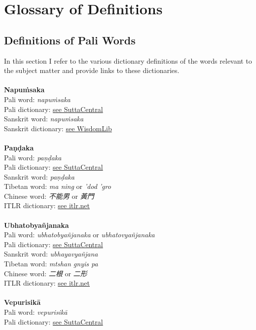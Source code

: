\section{Glossary of Definitions}
\label{appendix3}

\subsection{Definitions of Pali Words}
In this section I refer to the various dictionary definitions of the words relevant to the subject matter and provide links to these dictionaries.\\
\\
\medskip
\large \textbf{Napuṁsaka}
\\
Pali word: {\em napuṁsaka} \\
Pali dictionary: \href{https://suttacentral.net/define/napu%E1%B9%83saka}{see SuttaCentral} \\
Sanskrit word: {\em napuṁsaka} \\
Sanskrit dictionary: \href{https://www.wisdomlib.org/definition/napumsaka}{see WisdomLib} \\
\\
\medskip
\large \textbf{Paṇḍaka}
\\
Pali word: {\em paṇḍaka} \\
Pali dictionary: \href{https://suttacentral.net/define/pa%E1%B9%87%E1%B8%8Daka}{see SuttaCentral} \\
Sanskrit word: {\em paṇḍaka} \\
Tibetan word: {\em ma ning} or {\em ’dod ’gro} \\
Chinese word: {\em 不能男} or {\em 黃門}\\
ITLR dictionary: \href{http://www.itlr.net/hwid:281142}{see itlr.net} \\
\\
\medskip
\large \textbf{Ubhatob­yañ­janaka}
\\
Pali word: {\em ubhatob­yañ­janaka} or {\em ubhatovyañ­janaka} \\
Pali dictionary: \href{https://suttacentral.net/define/ubhatovya%C3%B1janaka}{see SuttaCentral} \\
Sanskrit word: {\em ubhayavyañjana} \\
Tibetan word: {\em mtshan gnyis pa} \\
Chinese word: {\em 二根} or {\em 二形}\\
ITLR dictionary: \href{http://www.itlr.net/hwid:62844}{see itlr.net} \\
\\
\medskip
\large \textbf{Vepurisikā}
\\
Pali word: {\em vepurisikā} \\
Pali dictionary: \href{https://suttacentral.net/define/vepurisik%C4%81}{see SuttaCentral} \\
\\
